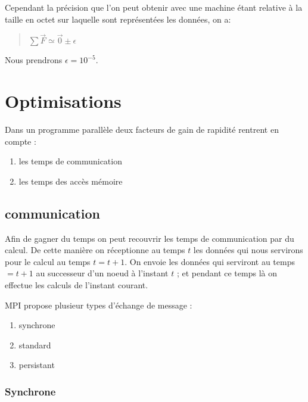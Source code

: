 \par Cependant la précision que l'on peut obtenir avec une machine étant relative à 
la taille en octet sur laquelle sont représentées les données, on a:
\begin{quote}
  \begin{center}
    $\sum \overrightarrow{F} \simeq \overrightarrow{0} \pm \epsilon$
  \end{center}
\end{quote}
Nous prendrons $\epsilon = 10^{-5}$.

\section{Optimisations}

\par Dans un programme parallèle deux facteurs de gain de rapidité rentrent en compte : 
\begin{enumerate}
\item les temps de communication 
\item les temps des accès mémoire
\end{enumerate}

\subsection{communication}

\par Afin de gagner du temps on peut recouvrir les temps de communication par du calcul. De
cette manière on réceptionne au temps $t$ les données qui nous servirons pour le
calcul au temps $t=t+1$. On envoie les données qui serviront au temps $=t+1$
au successeur d'un noeud à l'instant $t$ ; et pendant ce temps là on effectue les calculs 
de l'instant courant.\\

\par MPI propose plusieur types d'échange de message :\\
\begin{enumerate}
\item synchrone
\item standard
\item persistant
\end{enumerate}

\subsubsection{Synchrone}

